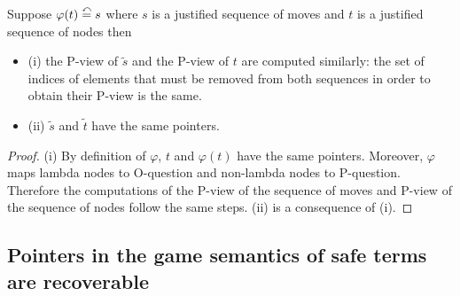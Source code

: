 \begin{property}
\label{proper:phi_pview}
Suppose $\varphi(t) \stackrel{\curvearrowleft}{=} s$ where $s$ is a justified sequence of moves and
$t$ is a justified sequence of nodes then
\begin{itemize}
\item (i) the P-view of $\tilde{s}$ and the P-view of $t$ are computed
similarly: the set of indices of elements that must be removed from both sequences
in order to obtain their P-view is the same.
\item (ii) $\tilde{s}$ and $\tilde{t}$ have the same pointers.
\end{itemize}
\end{property}
\begin{proof}
(i) By definition of $\varphi$, $t$ and $\varphi(t)$ have the same pointers. Moreover,
$\varphi$ maps lambda nodes to O-question and non-lambda nodes to P-question. Therefore the computations of the
P-view of the sequence of moves and P-view of the sequence of nodes follow the same steps.
(ii) is a consequence of (i).
\end{proof}

\subsection{Pointers in the game semantics of safe terms are recoverable}

